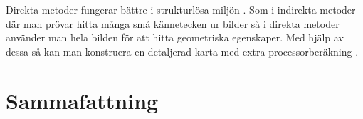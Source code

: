 Direkta metoder fungerar bättre i strukturlösa miljön \citep{Engel2014LSDSLAMLD}. Som i indirekta metoder där man prövar hitta många små kännetecken ur bilder så i direkta metoder använder man hela bilden för att hitta geometriska egenskaper. Med hjälp av dessa så kan man konstruera en detaljerad karta med extra processorberäkning \citep{geospatial}. 

\chapter{Sammafattning}

